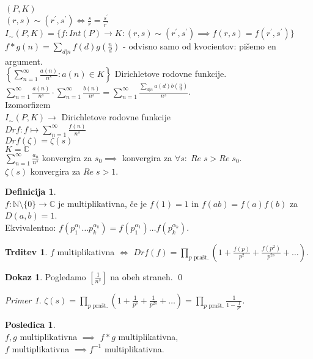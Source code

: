 \documentclass[a4paper, 12pt]{book}
\theoremstyle{definition}
\newtheorem{defn}[counter]{Definicija}
\newtheorem{conseq}[counter]{Posledica}
\newtheorem{claim}[counter]{Trditev}
\newtheorem{pro}[counter]{Dokaz}
\theoremstyle{remark}
\newtheorem*{ex}{Primer}
\newcommand{\N}{\mathbb{N}}
\newcommand{\C}{\mathbb{C}}
\begin{document}
$(P, K)$ \\
$(r, s) \sim (r^{'}, s^{'}) \iff \frac{s}{r} = \frac{s^{'}}{r^{'}}$ \\
$I_{\sim} (P, K) = \{f: Int(P) \to K: (r, s) \sim (r^{'}, s^{'}) \implies f(r, s) = f(r^{'}, s^{'})\}$ \\
$f * g(n) = \sum_{d | n} f(d) g\left(\frac{n}{d}\right)$ - odvisno samo od kvocientov: pišemo en argument. \\
$\left\{ \sum_{n=1}^{\infty} \frac{a(n)}{n^s}: a(n) \in K\right\}$ Dirichletove rodovne funkcije. \\
$\sum_{n=1}^{\infty} \frac{a(n)}{n^s} \cdot \sum_{n=1}^{\infty} \frac{b(n)}{n^s} =
\sum_{n=1}^{\infty} \frac{\sum_{d | n} a(d) b\left(\frac{n}{d}\right)}{n^s}$. \\
Izomorfizem \\
$I_{\sim} (P, K) \to$ Dirichletove rodovne funkcije \\
$Drf: f \mapsto \sum_{n=1}^{\infty} \frac{f(n)}{n^s}$ \\
$Drf(\zeta) = \zeta(s)$ \\
$K = \C$ \\
$\sum_{n=1}^{\infty} \frac{a_n}{n^s}$ konvergira za $s_0 \implies$ konvergira za $\forall s: \; Re \; s > Re \; s_0$. \\
$\zeta(s)$ konvergira za $Re \; s > 1$.
\begin{defn} \text{} \\
  $f: \N \setminus \{0\} \to \C$ je multiplikativna, če je $f(1) = 1$ in $f(ab) = f(a) f(b)$ za $D(a, b) = 1$. \\
  Ekvivalentno: $f\left(p_1^{\alpha_1} \dots p_k^{\alpha_k}\right) =
  f\left(p_1^{\alpha_1}\right) \dots f\left(p_k^{\alpha_k}\right)$.
\end{defn}
\begin{claim}
  $f$ multiplikativna $\iff$ $Drf(f) =
  \prod_{p \text{ prašt.}} \left(1 + \frac{f(p)}{p^2} + \frac{f(p^2)}{p^{2s}} + \dots\right)$.
\end{claim}
\begin{pro}
  Pogledamo $\left[\frac{1}{n^s}\right]$ na obeh straneh.
  \qed
\end{pro}
\begin{ex}
  $\zeta(s) = \prod_{p \text{ prašt.}} \left(1 + \frac{1}{p^s} + \frac{1}{p^{2s}} + \dots \right)
  = \prod_{p \text{ prašt.}} \frac{1}{1 - \frac{1}{p^s}}$.
\end{ex}
\begin{conseq} \text{} \\
  $f, g$ multiplikativna $\implies$ $f * g$ multiplikativna, \\
  $f$ multiplikativna $\implies f^{-1}$ multiplikativna. 
\end{conseq}
\end{document}
